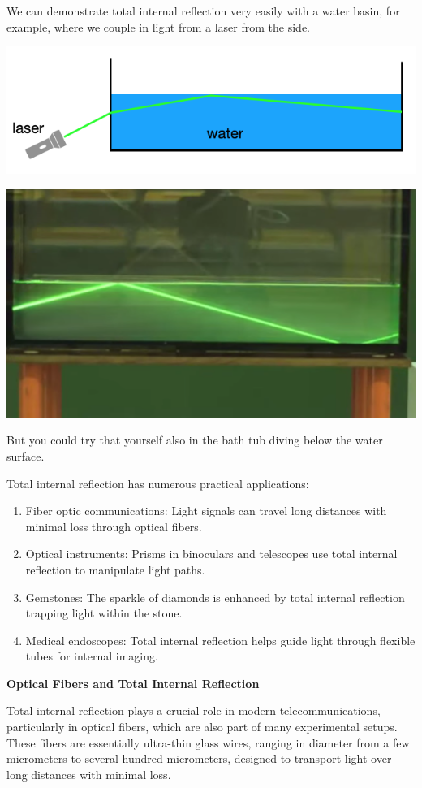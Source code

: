 \documentclass[
  a4paper,
]{book}
\providecommand{\tightlist}{%
  \setlength{\itemsep}{0pt}\setlength{\parskip}{0pt}}
\begin{document}
We can demonstrate total internal reflection very easily with a water
basin, for example, where we couple in light from a laser from the side.

\includegraphics[width=0.59\linewidth,height=\textheight,keepaspectratio]{geometrical-optics/../assets/images/reflection/basin_tir.png}
\begin{center}
\includegraphics[width=0.4\linewidth,height=\textheight,keepaspectratio]{geometrical-optics/../assets/images/reflection/tir_basin.png}
\end{center}

But you could try that yourself also in the bath tub diving below the
water surface.

Total internal reflection has numerous practical applications:

\begin{enumerate}
\def\labelenumi{\arabic{enumi}.}
\tightlist
\item
  Fiber optic communications: Light signals can travel long distances
  with minimal loss through optical fibers.
\item
  Optical instruments: Prisms in binoculars and telescopes use total
  internal reflection to manipulate light paths.
\item
  Gemstones: The sparkle of diamonds is enhanced by total internal
  reflection trapping light within the stone.
\item
  Medical endoscopes: Total internal reflection helps guide light
  through flexible tubes for internal imaging.
\end{enumerate}

\textbf{Optical Fibers and Total Internal Reflection}

Total internal reflection plays a crucial role in modern
telecommunications, particularly in optical fibers, which are also part
of many experimental setups. These fibers are essentially ultra-thin
glass wires, ranging in diameter from a few micrometers to several
hundred micrometers, designed to transport light over long distances
with minimal loss.
\end{document}
